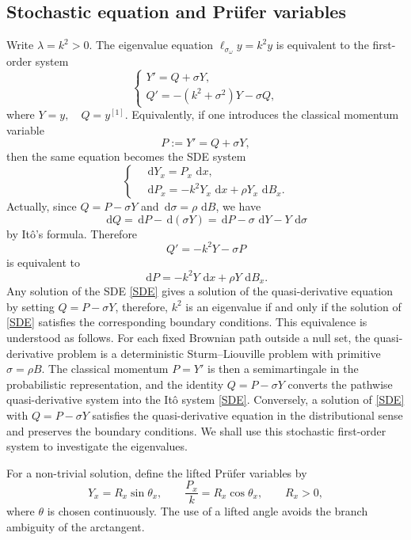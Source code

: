 \documentclass[11pt]{article}
\newcommand{\dd}{\,\mathrm d}
\begin{document}
\subsection{Stochastic equation and Pr\"ufer variables}
Write $\lambda=k^2>0$. The eigenvalue equation $\ell_{\sigma_\omega}y=k^2y$ is equivalent to the first-order system
\[
    \begin{cases}
    Y'=Q+\sigma Y,\\[2mm]
    Q'=-(k^2+\sigma^2)Y-\sigma Q,
    \end{cases}
\]
where \( 
Y=y,
\quad
Q=y^{[1]}.\)
Equivalently, if one introduces the classical momentum variable
\[
    P:=Y'=Q+\sigma Y,
\]
then the same equation becomes the SDE system
\begin{equation}\label{SDE}
\left\{
    \begin{aligned}
    &\dd Y_x=P_x\,\dd x,\\[2mm]
    &\dd P_x=-k^2Y_x\,\dd x+\rho Y_x\,\dd B_x.
    \end{aligned}\right.
\end{equation}
Actually, since $Q=P-\sigma Y$ and $\dd \sigma=\rho\,\dd B$, we have
\[
    \dd Q=\dd P-\dd (\sigma Y)
       =\dd P-\sigma\,\dd Y-Y\,\dd \sigma
\]
by It\^o's formula. Therefore 
\[
    Q'=-k^2Y-\sigma P
\]
is equivalent to
\[
    \dd P=-k^2Y\,\dd x+\rho Y\,\dd B_x.
\]
Any solution of the SDE \eqref{SDE} gives a solution of the quasi-derivative equation by setting $Q=P-\sigma Y$, therefore, \(k^2\) is an eigenvalue if and only if the solution of \eqref{SDE} satisfies the corresponding boundary conditions. This equivalence is understood as follows. For each fixed Brownian path outside a null set, the quasi-derivative problem is a deterministic Sturm--Liouville problem with primitive $\sigma=\rho B$. The classical momentum $P=Y'$ is then a semimartingale in the probabilistic representation, and the identity $Q=P-\sigma Y$ converts the pathwise quasi-derivative system into the It\^o system \eqref{SDE}. Conversely, a solution of \eqref{SDE} with $Q=P-\sigma Y$ satisfies the quasi-derivative equation in the distributional sense and preserves the boundary conditions. We shall use this stochastic first-order system to investigate the eigenvalues.

For a non-trivial solution, define the lifted Pr\"ufer variables by
\[
    Y_x=R_x\sin\theta_x,
    \qquad
    \frac{P_x}{k}=R_x\cos\theta_x,
    \qquad R_x>0,
\]
where $\theta$ is chosen continuously. The use of a lifted angle avoids the branch ambiguity of the arctangent.
\end{document}
